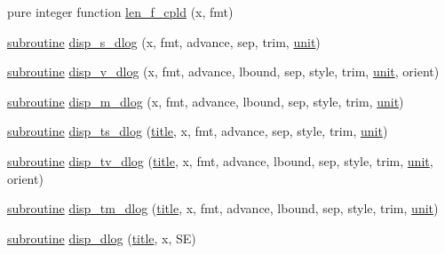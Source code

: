 \begin{DoxyCompactItemize}
pure integer function \hyperlink{namespacem__display_a803611d2a793f2a4aa7563b6c8295cb3}{len\+\_\+f\+\_\+cpld} (x, fmt)
\item 
\hyperlink{M__stopwatch_83_8txt_acfbcff50169d691ff02d4a123ed70482}{subroutine} \hyperlink{namespacem__display_a610ad67c4cfcad91bb6281b2c7ac3e07}{disp\+\_\+s\+\_\+dlog} (x, fmt, advance, sep, trim, \hyperlink{M__stopwatch_83_8txt_a5cbef30eb7c0d734bd82f5a7ebea9aa7}{unit})
\item 
\hyperlink{M__stopwatch_83_8txt_acfbcff50169d691ff02d4a123ed70482}{subroutine} \hyperlink{namespacem__display_ae5c96bc7b0b54e6e183431c31fa7ae80}{disp\+\_\+v\+\_\+dlog} (x, fmt, advance, lbound, sep, style, trim, \hyperlink{M__stopwatch_83_8txt_a5cbef30eb7c0d734bd82f5a7ebea9aa7}{unit}, orient)
\item 
\hyperlink{M__stopwatch_83_8txt_acfbcff50169d691ff02d4a123ed70482}{subroutine} \hyperlink{namespacem__display_ab6b5841935e6e08ce9d8a293f2e7c18a}{disp\+\_\+m\+\_\+dlog} (x, fmt, advance, lbound, sep, style, trim, \hyperlink{M__stopwatch_83_8txt_a5cbef30eb7c0d734bd82f5a7ebea9aa7}{unit})
\item 
\hyperlink{M__stopwatch_83_8txt_acfbcff50169d691ff02d4a123ed70482}{subroutine} \hyperlink{namespacem__display_a7d4d5976a28b9a9ee9bad6afb0f8a7b9}{disp\+\_\+ts\+\_\+dlog} (\hyperlink{print__watch_83_8txt_a15b5bd21156bb9fca6a755ab8c029a9c}{title}, x, fmt, advance, sep, style, trim, \hyperlink{M__stopwatch_83_8txt_a5cbef30eb7c0d734bd82f5a7ebea9aa7}{unit})
\item 
\hyperlink{M__stopwatch_83_8txt_acfbcff50169d691ff02d4a123ed70482}{subroutine} \hyperlink{namespacem__display_af30fd70a2bb8a821b5f843bb6e4bedf8}{disp\+\_\+tv\+\_\+dlog} (\hyperlink{print__watch_83_8txt_a15b5bd21156bb9fca6a755ab8c029a9c}{title}, x, fmt, advance, lbound, sep, style, trim, \hyperlink{M__stopwatch_83_8txt_a5cbef30eb7c0d734bd82f5a7ebea9aa7}{unit}, orient)
\item 
\hyperlink{M__stopwatch_83_8txt_acfbcff50169d691ff02d4a123ed70482}{subroutine} \hyperlink{namespacem__display_a0b5f8c9a84f77bedd9b8e6cd6bb8a093}{disp\+\_\+tm\+\_\+dlog} (\hyperlink{print__watch_83_8txt_a15b5bd21156bb9fca6a755ab8c029a9c}{title}, x, fmt, advance, lbound, sep, style, trim, \hyperlink{M__stopwatch_83_8txt_a5cbef30eb7c0d734bd82f5a7ebea9aa7}{unit})
\item 
\hyperlink{M__stopwatch_83_8txt_acfbcff50169d691ff02d4a123ed70482}{subroutine} \hyperlink{namespacem__display_ac6960db2f07da55b2c8a72f30531ed97}{disp\+\_\+dlog} (\hyperlink{print__watch_83_8txt_a15b5bd21156bb9fca6a755ab8c029a9c}{title}, x, SE)

\end{DoxyCompactItemize}
